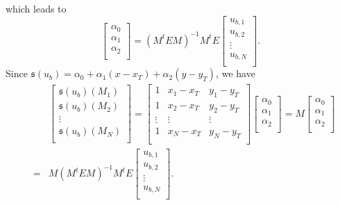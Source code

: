 \documentclass[final,leqno]{siamltex704}
\def\S{{\mathfrak s}}
\begin{document}
which leads to
\begin{equation}\label{EQ:alpha}
\begin{bmatrix}
\alpha_0  \\
\alpha_1  \\
\alpha_2  \\
\end{bmatrix}
=(M^tEM)^{-1}M^tE
\begin{bmatrix}
u_{b,1} \\
u_{b,2} \\
\vdots  \\
u_{b,N} \\
\end{bmatrix}.
\end{equation}
Since $\S(u_b)=\alpha_0 + \alpha_1 (x-x_T) + \alpha_2 (y-y_T)$, we have
\begin{eqnarray*}
&& \begin{bmatrix}
\S(u_{b})(M_1) \\
\S(u_{b})(M_2) \\
\vdots  \\
\S(u_{b})(M_N) \\
\end{bmatrix}
=
\begin{bmatrix}
1      & x_{1} - x_T & y_{1} - y_T\\
1      & x_{2} - x_T & y_{2} - y_T\\
\vdots & \vdots        & \vdots       \\
1      & x_{N} - x_T & y_{N} - y_T\\
\end{bmatrix}
\begin{bmatrix}
\alpha_0\\
\alpha_1\\
\alpha_2\\
\end{bmatrix}
=M
\begin{bmatrix}
\alpha_0\\
\alpha_1\\
\alpha_2\\
\end{bmatrix} \\
&=&M(M^tEM)^{-1}M^tE
\begin{bmatrix}
u_{b,1} \\
u_{b,2} \\
\vdots  \\
u_{b,N} \\
\end{bmatrix}.
\end{eqnarray*}
\end{document}
